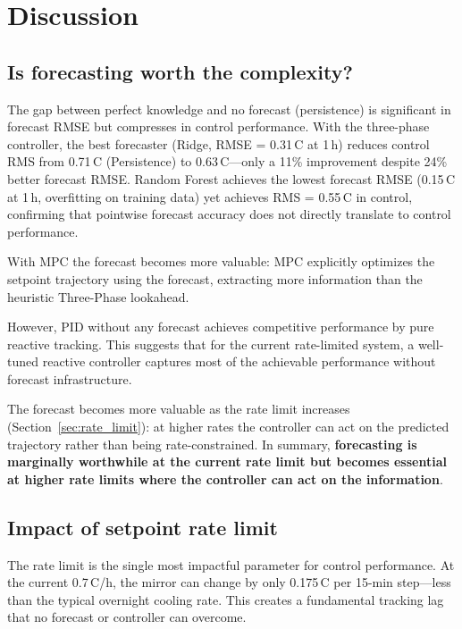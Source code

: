 \documentclass[11pt]{article}
\begin{document}
\section{Discussion}
\label{sec:discussion}

\subsection{Is forecasting worth the complexity?}

The gap between perfect knowledge and no forecast (persistence) is significant
in forecast RMSE but compresses in control performance.  With the three-phase
controller, the best forecaster (Ridge, RMSE = 0.31\,\textdegree C at 1\,h)
reduces control RMS from 0.71\,\textdegree C (Persistence) to
0.63\,\textdegree C---only a 11\% improvement despite 24\% better forecast
RMSE.  Random Forest achieves the lowest forecast RMSE (0.15\,\textdegree C at
1\,h, overfitting on training data) yet achieves RMS = 0.55\,\textdegree C in
control, confirming that pointwise forecast accuracy does not directly
translate to control performance.

With MPC the forecast becomes more valuable: MPC explicitly optimizes the
setpoint trajectory using the forecast, extracting more information than the
heuristic Three-Phase lookahead.

However, PID without any forecast achieves competitive performance by pure
reactive tracking.  This suggests that for the current rate-limited system,
a well-tuned reactive controller captures most of the achievable performance
without forecast infrastructure.

The forecast becomes more valuable as the rate limit increases
(Section~\ref{sec:rate_limit}): at higher rates the controller can act on
the predicted trajectory rather than being rate-constrained.  In summary,
\textbf{forecasting is marginally worthwhile at the current rate limit but
becomes essential at higher rate limits where the controller can act on the
information}.

\subsection{Impact of setpoint rate limit}

The rate limit is the single most impactful parameter for control performance.
At the current 0.7\,\textdegree C/h, the mirror can change by only
0.175\,\textdegree C per 15-min step---less than the typical overnight cooling
rate.  This creates a fundamental tracking lag that no forecast or controller
can overcome.
\end{document}
